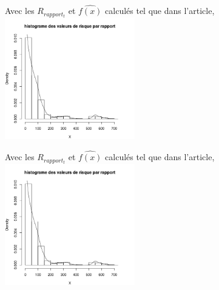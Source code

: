 \begin{frame}[t]
	Avec les $R_{rapport_t}$ et $\widehat{f(x)}$ calculés tel que dans l'article, \\
	\includegraphics[height=200px] {histogramme_risque_rapport_kde}	
\end{frame}


\begin{frame}[t]
	Avec les $R_{rapport_t}$ et $\widehat{f(x)}$ calculés tel que dans l'article, \\
	\includegraphics[height=200px] {histogramme_risque_rapport_kde}	
\end{frame}




